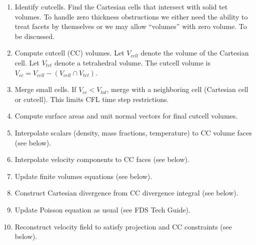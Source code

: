 \documentclass[12pt]{article}
\begin{document}
\begin{enumerate}
\item Identify cutcells.  Find the Cartesian cells that intersect with solid tet volumes.  To handle zero thickness obstructions we either need the ability to treat facets by themselves or we may allow ``volumes'' with zero volume.  To be discussed.
\item Compute cutcell (CC) volumes.  Let $V_{cell}$ denote the volume of the Cartesian cell.  Let $V_{tet}$ denote a tetrahedral volume.  The cutcell volume is $V_{cc} = V_{cell} - ( V_{cell} \cap V_{tet} )$.
\item Merge small cells.  If $V_{cc} < V_{tol}$, merge with a neighboring cell (Cartesian cell or cutcell).  This limits CFL time step restrictions.
\item Compute surface areas and unit normal vectors for final cutcell volumes.
\item Interpolate scalars (density, mass fractions, temperature) to CC volume faces (see below).
\item Interpolate velocity components to CC faces (see below).
\item Update finite volumes equations (see below).
\item Construct Cartesian divergence from CC divergence integral (see below).
\item Update Poisson equation as usual (see FDS Tech Guide).
\item Reconstruct velocity field to satisfy projection and CC constraints (see below).
\end{enumerate}
\end{document}
